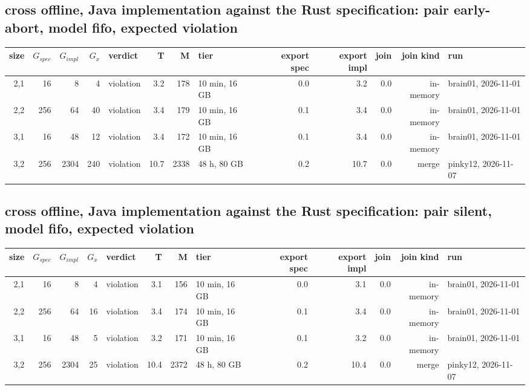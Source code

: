 \documentclass[10pt]{article}
\begin{document}
\subsection*{cross offline, Java implementation against the Rust specification: pair \textsf{early-abort}, model fifo, expected violation}
\begin{longtable}{@{}rrrrlrrlrrrrl@{}}
\toprule
size & $G_{\mathit{spec}}$ & $G_{\mathit{impl}}$ & $G_x$ & verdict & T & M & tier & export spec & export impl & join & join kind & run \\
\midrule
\endhead
\color{red} 2,1 & 16 & 8 & 4 & violation & 3.2 & 178 & 10 min, 16 GB & 0.0 & 3.2 & 0.0 & in-memory & brain01, 2026-11-01 \\
\color{red} 2,2 & 256 & 64 & 40 & violation & 3.4 & 179 & 10 min, 16 GB & 0.1 & 3.4 & 0.0 & in-memory & brain01, 2026-11-01 \\
\color{red} 3,1 & 16 & 48 & 12 & violation & 3.4 & 172 & 10 min, 16 GB & 0.1 & 3.4 & 0.0 & in-memory & brain01, 2026-11-01 \\
\color{red} 3,2 & 256 & 2304 & 240 & violation & 10.7 & 2338 & 48 h, 80 GB & 0.2 & 10.7 & 0.0 & merge & pinky12, 2026-11-07 \\
\bottomrule
\end{longtable}
\subsection*{cross offline, Java implementation against the Rust specification: pair \textsf{silent}, model fifo, expected violation}
\begin{longtable}{@{}rrrrlrrlrrrrl@{}}
\toprule
size & $G_{\mathit{spec}}$ & $G_{\mathit{impl}}$ & $G_x$ & verdict & T & M & tier & export spec & export impl & join & join kind & run \\
\midrule
\endhead
\color{red} 2,1 & 16 & 8 & 4 & violation & 3.1 & 156 & 10 min, 16 GB & 0.0 & 3.1 & 0.0 & in-memory & brain01, 2026-11-01 \\
\color{red} 2,2 & 256 & 64 & 16 & violation & 3.4 & 174 & 10 min, 16 GB & 0.1 & 3.4 & 0.0 & in-memory & brain01, 2026-11-01 \\
\color{red} 3,1 & 16 & 48 & 5 & violation & 3.2 & 171 & 10 min, 16 GB & 0.1 & 3.2 & 0.0 & in-memory & brain01, 2026-11-01 \\
\color{red} 3,2 & 256 & 2304 & 25 & violation & 10.4 & 2372 & 48 h, 80 GB & 0.2 & 10.4 & 0.0 & merge & pinky12, 2026-11-07 \\
\bottomrule
\end{longtable}
\end{document}
